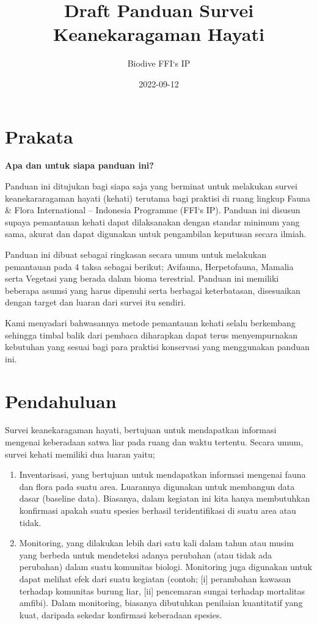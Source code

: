 \documentclass[
]{book}
\title{Draft Panduan Survei Keanekaragaman Hayati}
\author{Biodive FFI`s IP}
\date{2022-09-12}
\begin{document}
\maketitle

{
\setcounter{tocdepth}{1}
\tableofcontents
}
\hypertarget{prakata}{%
\chapter*{Prakata}\label{prakata}}

\textbf{Apa dan untuk siapa panduan ini?}

Panduan ini ditujukan bagi siapa saja yang berminat untuk melakukan survei keanekararagaman hayati (kehati) terutama bagi praktisi di ruang lingkup Fauna \& Flora International -- Indonesia Programme (FFI`s IP). Panduan ini disusun supaya pemantauan kehati dapat dilaksanakan dengan standar minimum yang sama, akurat dan dapat digunakan untuk pengambilan keputusan secara ilmiah.

Panduan ini dibuat sebagai ringkasan secara umum untuk melakukan pemantauan pada 4 taksa sebagai berikut; Avifauna, Herpetofauna, Mamalia serta Vegetasi yang berada dalam bioma terestrial. Panduan ini memiliki beberapa asumsi yang harus dipenuhi serta berbagai keterbatasan, disesuaikan dengan target dan luaran dari survei itu sendiri.

Kami menyadari bahwasannya metode pemantauan kehati selalu berkembang sehingga timbal balik dari pembaca diharapkan dapat terus menyempurnakan kebutuhan yang sesuai bagi para praktisi konservasi yang menggunakan panduan ini.

\hypertarget{pendahuluan}{%
\chapter*{Pendahuluan}\label{pendahuluan}}

Survei keanekaragaman hayati, bertujuan untuk mendapatkan informasi mengenai keberadaan satwa liar pada ruang dan waktu tertentu. Secara umum, survei kehati memiliki dua luaran yaitu;

\begin{enumerate}
\def\labelenumi{(\arabic{enumi})}
\item
  Inventarisasi, yang bertujuan untuk mendapatkan informasi mengenai fauna dan flora pada suatu area. Luarannya digunakan untuk membangun data dasar (baseline data). Biasanya, dalam kegiatan ini kita hanya membutuhkan konfirmasi apakah suatu spesies berhasil teridentifikasi di suatu area atau tidak.
\item
  Monitoring, yang dilakukan lebih dari satu kali dalam tahun atau musim yang berbeda untuk mendeteksi adanya perubahan (atau tidak ada perubahan) dalam suatu komunitas biologi. Monitoring juga digunakan untuk dapat melihat efek dari suatu kegiatan (contoh; {[}i{]} perambahan kawasan terhadap komunitas burung liar, {[}ii{]} pencemaran sungai terhadap mortalitas amfibi). Dalam monitoring, biasanya dibutuhkan penilaian kuantitatif yang kuat, daripada sekedar konfirmasi keberadaan spesies.
\end{enumerate}
\end{document}
